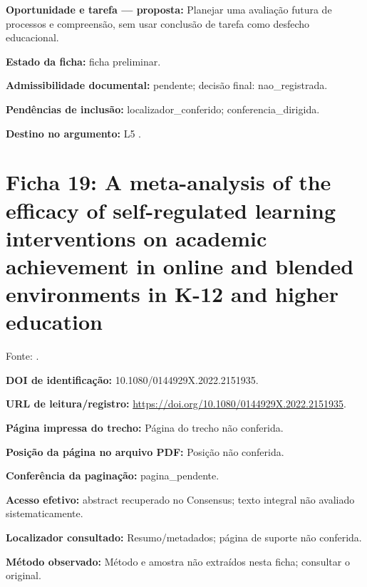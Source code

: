 \noindent\textbf{Oportunidade e tarefa — proposta:} Planejar uma avaliação futura de processos e compreensão, sem usar conclusão de tarefa como desfecho educacional.\par\medskip

\noindent\textbf{Estado da ficha:} ficha preliminar.\par\medskip

\noindent\textbf{Admissibilidade documental:} pendente; decisão final: nao\_registrada.\par\medskip

\noindent\textbf{Pendências de inclusão:} localizador\_conferido; conferencia\_dirigida.\par\medskip

\noindent\textbf{Destino no argumento:} L5 .

\clearpage\section*{Ficha 19: A meta-analysis of the efficacy of self-regulated learning interventions on academic achievement in online and blended environments in K-12 and higher education}

Fonte: \citet{education_xu2022}.

\noindent\textbf{DOI de identificação:} 10.1080/0144929X.2022.2151935.\par\medskip

\noindent\textbf{URL de leitura/registro:} \url{https://doi.org/10.1080/0144929X.2022.2151935}.\par\medskip

\noindent\textbf{Página impressa do trecho:} Página do trecho não conferida.\par\medskip

\noindent\textbf{Posição da página no arquivo PDF:} Posição não conferida.\par\medskip

\noindent\textbf{Conferência da paginação:} pagina\_pendente.\par\medskip

\noindent\textbf{Acesso efetivo:} abstract recuperado no Consensus; texto integral não avaliado sistematicamente.\par\medskip

\noindent\textbf{Localizador consultado:} Resumo/metadados; página de suporte não conferida.\par\medskip

\noindent\textbf{Método observado:} Método e amostra não extraídos nesta ficha; consultar o original.\par\medskip


